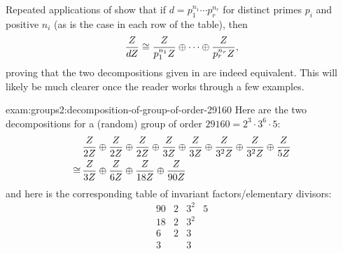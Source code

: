Repeated applications of  show that if
$d = p_1^{n_1} \cdots p_r^{n_r}$ for distinct primes $p_i$ and
positive $n_i$ (as is the case in each row of the table), then
\[\frac{Z}{dZ} \cong
  \frac{Z}{p_1^{n_1}Z} \oplus \cdots \oplus
  \frac{Z}{p_r^{n_r}Z},\] proving that the two decompositions given
in  are indeed equivalent. This will likely be
much clearer once the reader works through a few examples.
\begin{exam}{}{exam:groups2:decomposition-of-group-of-order-29160}
  Here are the two decompositions for a (random) group of order
  $29160 = 2^3 \cdot 3^6 \cdot 5$:
  \begin{align*}
    &\frac{Z}{2Z} \oplus
      \frac{Z}{2Z} \oplus
      \frac{Z}{2Z} \oplus
      \frac{Z}{3Z} \oplus
      \frac{Z}{3Z} \oplus
      \frac{Z}{3^2Z} \oplus
      \frac{Z}{3^2Z} \oplus
      \frac{Z}{5Z} \\
    \cong\,&\frac{Z}{3Z} \oplus
             \frac{Z}{6Z} \oplus
             \frac{Z}{18Z} \oplus
             \frac{Z}{90Z}
  \end{align*}
  and here is the corresponding table of invariant factors/elementary
  divisors:
  \[
    \begin{array}{c||c|c|c}
      90 & 2 & 3^2 & 5 \\
      18 & 2 & 3^2 &   \\
      6 & 2 & 3   &   \\
      3 &   & 3   &
    \end{array}
  \]
\end{exam}
